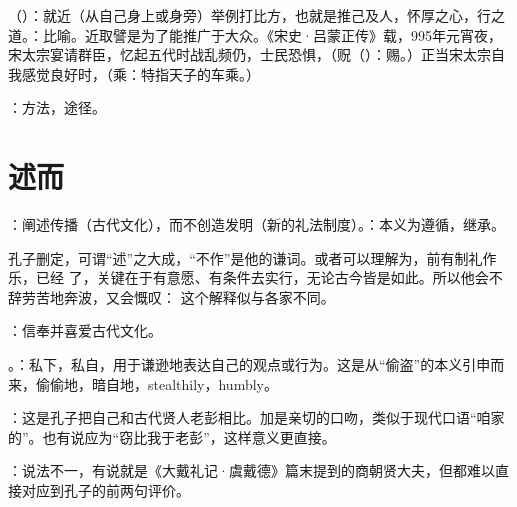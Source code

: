 {\item {}（）：就近（从自己身上或身旁）举例打比方，也就是推己及人，怀厚之心，行之道。：比喻。近取譬是为了能推广于大众。《宋史·吕蒙正传》载，995年元宵夜，宋太宗宴请群臣，忆起五代时战乱频仍，士民恐惧，（贶（）：赐。）正当宋太宗自我感觉良好时，（乘：特指天子的车乘。）
\item {}：方法，途径。
}
{}



\chapter{述而}

{
\item {}：阐述传播（古代文化），而不创造发明（新的礼法制度）。：本义为遵循，继承。

孔子删定，可谓“述”之大成，“不作”是他的谦词。或者可以理解为，前有制礼作乐，已经  了，关键在于有意愿、有条件去实行，无论古今皆是如此。所以他会不辞劳苦地奔波，又会慨叹： 这个解释似与各家不同。

\item {}：信奉并喜爱古代文化。

\item {}。：私下，私自，用于谦逊地表达自己的观点或行为。这是从“偷盗”的本义引申而来，偷偷地，暗自地，stealthily，humbly。

：这是孔子把自己和古代贤人老彭相比。加是亲切的口吻，类似于现代口语“咱家的”。也有说应为“窃比我于老彭”，这样意义更直接。

：说法不一，有说就是《大戴礼记·虞戴德》篇末提到的商朝贤大夫，但都难以直接对应到孔子的前两句评价。
}
{}


